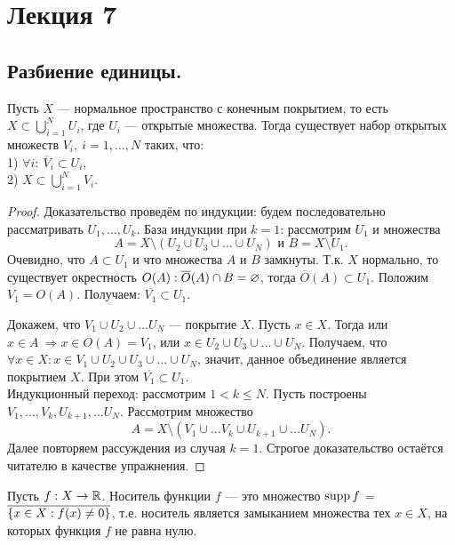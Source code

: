 \section{Лекция 7}

\subsection{Разбиение единицы.}

\begin{lemma}[об ужатии]
    Пусть $X$ --- нормальное пространство с конечным покрытием, то есть $X \subset \bigcup_{i = 1}^N U_i$, где $U_i$ --- открытые множества.
    Тогда существует набор открытых множеств $V_i, \ i = 1, \ldots, N$ таких, что: \\
    1) $\forall i: \ \overline{V}_i \subset U_i$, \\ 
    2) $X \subset \bigcup_{i = 1}^{N} V_i$.
\end{lemma}
\begin{proof}
    Доказательство проведём по индукции: будем последовательно рассматривать $U_1, \ldots, U_k$. База индукции при $k = 1$: рассмотрим $U_1$ и множества
    \[
        A = X \setminus (U_2 \cup U_3 \cup \ldots \cup U_N) \text{ и } B = X \setminus U_1.
    \]
    Очевидно, что $A \subset U_1$ и что множества $A$ и $B$ замкнуты. Т.к. $X$ нормально, то существует окрестность $O(A): \overline{O}(A) \cap B = \varnothing$, тогда $\overline{O}(A) \subset U_1$. Положим $V_1 = O(A)$.
    Получаем: $\overline{V_1} \subset U_1$.

    Докажем, что $V_1 \cup U_2 \cup \ldots U_N$ --- покрытие $X$.
    Пусть $x \in X$. Тогда или $x \in A \ \Longrightarrow x \in O(A) = V_1$, или $x \in U_2 \cup U_3 \cup \ldots \cup U_N$.
    Получаем, что $\forall x \in X: x \in V_1 \cup U_2 \cup U_3 \cup \ldots \cup U_N$, значит, данное объединение является покрытием $X$. При этом $\overline{V_1} \subset U_1$. \\
    Индукционный переход: рассмотрим $1 < k \leq N$. Пусть построены  $V_1, \ldots, V_k, U_{k + 1}, \ldots U_N$. Рассмотрим множество
    \[
        A = X \setminus (V_1 \cup \ldots V_k \cup U_{k + 1} \cup \ldots U_N).
    \]
    Далее повторяем рассуждения из случая $k = 1$. Строгое доказательство остаётся читателю в качестве упражнения.
\end{proof}

\begin{definition}
    Пусть $f: X \rightarrow \mathbb{R}$. Носитель функции $f$ --- это множество $\operatorname{supp}{f}$ = $\overline{\left\{x \in X : f(x) \neq 0\right\}}$, т.е. носитель является замыканием множества тех $x \in X$, на которых функция $f$ не равна нулю.
\end{definition}

